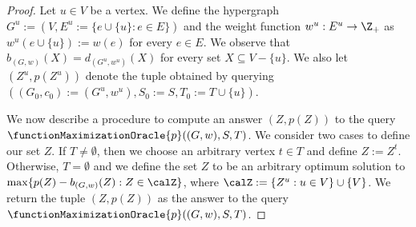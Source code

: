 \begin{proof}
Let $u \in V$ be a vertex. We define the hypergraph $G^u := (V, E^u := \{e \cup \{u\} : e \in E\})$ and the weight function $w^u : E^u \rightarrow\Z_+$ as $w^u(e \cup \{u\}) := w(e)$ for every $e \in E$. We observe that $b_{(G, w)}(X) = d_{(G^u, w^u)}(X)$ for every set $X \subseteq V - \{u\}$. We also let $(Z^u, p(Z^u))$ denote the tuple obtained by querying $((G_0, c_0) := (G^u, w^u), S_0 := S, T_0 := T\cup \{u\})$.

We now describe a procedure to compute an answer $(Z, p(Z))$ to the query $\functionMaximizationOracle{p}((G,w), S, T)$. We consider two cases to define our set $Z$. If $T \not= \emptyset$, then we choose an arbitrary vertex $t \in T$ and define $Z := Z^t$. Otherwise, $T = \emptyset$ and we define the set $Z$ to be an arbitrary optimum solution to $\max\{p(Z) - b_{(G, w)}(Z) : Z \in \calZ \}$, where $\calZ := \{Z^u: u \in V\} \cup \{ V\}$.  We return the tuple $(Z, p(Z))$ as the answer to the query $\functionMaximizationOracle{p}((G, w), S, T)$.


\end{proof}
